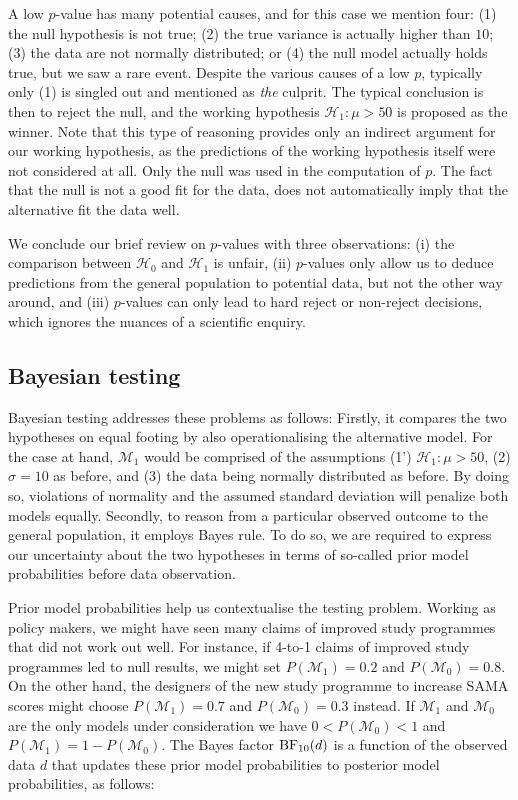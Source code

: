 \documentclass[english,,doc,floatsintext]{apa6}
\begin{document}
A low \(p\)-value has many potential causes, and for this case we mention four: (1) the null hypothesis is not true; (2) the true variance is actually higher than \(10\); (3) the data are not normally distributed; or (4) the null model actually holds true, but we saw a rare event. Despite the various causes of a low \(p\), typically only (1) is singled out and mentioned as \emph{the} culprit. The typical conclusion is then to reject the null, and the working hypothesis \(\mathcal{H}_{1} : \mu > 50\) is proposed as the winner. Note that this type of reasoning provides only an indirect argument for our working hypothesis, as the predictions of the working hypothesis itself were not considered at all. Only the null was used in the computation of \(p\). The fact that the null is not a good fit for the data, does not automatically imply that the alternative fit the data well.

We conclude our brief review on \(p\)-values with three observations: (i) the comparison between \(\mathcal{H}_{0}\) and \(\mathcal{H}_{1}\) is unfair, (ii) \(p\)-values only allow us to deduce predictions from the general population to potential data, but not the other way around, and (iii) \(p\)-values can only lead to hard reject or non-reject decisions, which ignores the nuances of a scientific enquiry.

\subsection{Bayesian testing}

Bayesian testing addresses these problems as follows: Firstly, it compares the two hypotheses on equal footing by also operationalising the alternative model. For the case at hand, \(\mathcal{M}_{1}\) would be comprised of the assumptions (1') \(\mathcal{H}_{1}: \mu > 50\), (2) \(\sigma =10\) as before, and (3) the data being normally distributed as before. By doing so, violations of normality and the assumed standard deviation will penalize both models equally. Secondly, to reason from a particular observed outcome to the general population, it employs Bayes rule. To do so, we are required to express our uncertainty about the two hypotheses in terms of so-called prior model probabilities before data observation.

Prior model probabilities help us contextualise the testing problem. Working as policy makers, we might have seen many claims of improved study programmes that did not work out well. For instance, if 4-to-1 claims of improved study programmes led to null results, we might set \(P( \mathcal{M}_{1}) = 0.2\) and \(P(\mathcal{M}_{0}) = 0.8\). On the other hand, the designers of the new study programme to increase SAMA scores might choose \(P( \mathcal{M}_{1}) = 0.7\) and \(P(\mathcal{M}_{0}) = 0.3\) instead. If \(\mathcal{M}_{1}\) and \(\mathcal{M}_{0}\) are the only models under consideration we have \(0 < P( \mathcal{M}_{0}) < 1\) and \(P( \mathcal{M}_{1})= 1 - P( \mathcal{M}_{0})\). The Bayes factor \(\textnormal{BF}_{10}(d)\) is a function of the observed data \(d\) that updates these prior model probabilities to posterior model probabilities, as follows:
\end{document}
